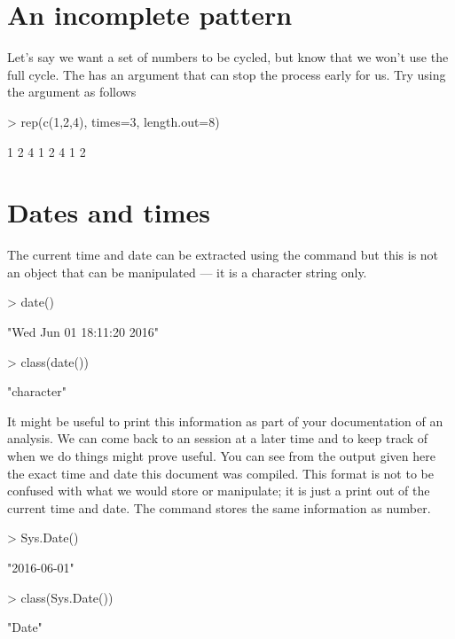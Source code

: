 \section{An incomplete pattern}

Let's say we want a set of numbers to be cycled, but know that we won't use the full cycle. The  has an argument that can stop the process early for us. Try using the  argument as follows
\begin{Schunk}
\begin{Sinput}
> rep(c(1,2,4), times=3, length.out=8)
\end{Sinput}
\begin{Soutput}
[1] 1 2 4 1 2 4 1 2
\end{Soutput}
\end{Schunk}


\section{Dates and times}

The current time and date can be extracted using the  command but this is not an object that can be manipulated --- it is a character string only.
\begin{Schunk}
\begin{Sinput}
> date()
\end{Sinput}
\begin{Soutput}
[1] "Wed Jun 01 18:11:20 2016"
\end{Soutput}
\begin{Sinput}
> class(date())
\end{Sinput}
\begin{Soutput}
[1] "character"
\end{Soutput}
\end{Schunk}
It might be useful to print this information as part of your documentation of an analysis. We can come back to an \R{} session at a later time and to keep track of when we do things might prove useful. You can see from the output given here the exact time and date this document was compiled. This format is not to be confused with what we would store or manipulate; it is just a print out of the current time and date. The  command stores the same information as number.
\begin{Schunk}
\begin{Sinput}
> Sys.Date()
\end{Sinput}
\begin{Soutput}
[1] "2016-06-01"
\end{Soutput}
\begin{Sinput}
> class(Sys.Date())
\end{Sinput}
\begin{Soutput}
[1] "Date"
\end{Soutput}
\end{Schunk}


